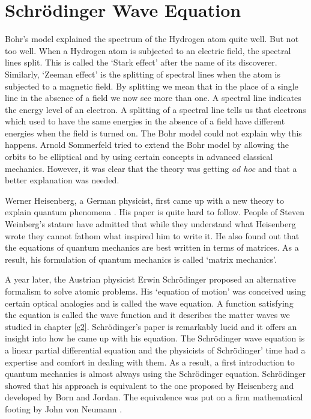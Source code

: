 \chapter{Schr\"{o}dinger Wave Equation}\label{c4}
Bohr's model explained the spectrum of the Hydrogen atom quite well. But not
too well. When a Hydrogen atom is subjected to an electric field, the spectral
lines split. This is called the `Stark effect' after the name of its discoverer.
Similarly, `Zeeman effect' is the splitting of spectral lines when the atom is
subjected to a magnetic field. By splitting we mean that in the place of a 
single line in the absence of a field we now see more than one. A spectral line
indicates the energy level of an electron. A splitting of a spectral line tells
us that electrons which used to have the same energies in the absence of a 
field have different energies when the field is turned on. The Bohr model 
could not explain why this happens. Arnold Sommerfeld tried to extend the Bohr
model by allowing the orbits to be elliptical and by using certain concepts in
advanced classical mechanics. However, it was clear that the theory was getting
\emph{ad hoc} and that a better explanation was needed.

Werner Heisenberg, a German physicist, first came up with a new theory to
explain quantum phenomena \cite{heisenberg1925quantum}. His paper is quite
hard to follow. People of Steven Weinberg's \cite{aitchison2004understanding}
stature have admitted that while they understand what Heisenberg wrote they 
cannot fathom what inspired him to write it. He also found out that the 
equations of quantum mechanics are best written in terms of matrices. As a 
result, his formulation of quantum mechanics is called `matrix mechanics'.

A year later, the Austrian physicist Erwin Schr\"{o}dinger proposed an 
alternative formalism to solve atomic problems. His `equation of motion' was 
conceived using certain optical analogies and is called the wave equation. A
function satisfying the equation is called the wave function and it describes
the matter waves we studied in chapter \ref{c2}. Schr\"{o}dinger's paper
\cite{schrodinger1926undulatory} is remarkably lucid and it offers an insight
into how he came up with his equation. The Schr\"{o}dinger wave equation
is a linear partial differential equation and the physicists of 
Schr\"{o}dinger' time had a expertise and comfort in dealing with them. As a 
result, a first introduction to quantum mechanics is almost always using the
Schr\"{o}dinger equation. Schr\"{o}dinger showed \cite{schrodinger1926relation}
that his approach is equivalent to the one proposed by Heisenberg and developed
by Born and Jordan. The equivalence was put on a firm mathematical footing by
John von Neumann \cite{von2018mathematical}.

